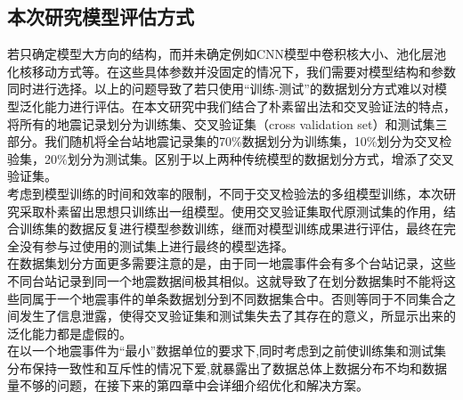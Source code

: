 \subsection{本次研究模型评估方式}
\indent 若只确定模型大方向的结构，而并未确定例如CNN模型中卷积核大小、池化层池化核移动方式等。在这些具体参数并没固定的情况下，我们需要对模型结构和参数同时进行选择。以上的问题导致了若只使用“训练-测试”的数据划分方式难以对模型泛化能力进行评估。在本文研究中我们结合了朴素留出法和交叉验证法的特点，将所有的地震记录划分为训练集、交叉验证集（cross validation set）和测试集三部分。我们随机将全台站地震记录集的70\%数据划分为训练集，10\%划分为交叉检验集，20\%划分为测试集。区别于以上两种传统模型的数据划分方式，增添了交叉验证集。\\
\indent 考虑到模型训练的时间和效率的限制，不同于交叉检验法的多组模型训练，本次研究采取朴素留出思想只训练出一组模型。使用交叉验证集取代原测试集的作用，结合训练集的数据反复进行模型参数训练，继而对模型训练成果进行评估，最终在完全没有参与过使用的测试集上进行最终的模型选择。\\
\indent 在数据集划分方面更多需要注意的是，由于同一地震事件会有多个台站记录，这些不同台站记录到同一个地震数据间极其相似。这就导致了在划分数据集时不能将这些同属于一个地震事件的单条数据划分到不同数据集合中。否则等同于不同集合之间发生了信息泄露，使得交叉验证集和测试集失去了其存在的意义，所显示出来的泛化能力都是虚假的。\\
\indent 在以一个地震事件为“最小”数据单位的要求下,同时考虑到之前使训练集和测试集分布保持一致性和互斥性的情况下爱,就暴露出了数据总体上数据分布不均和数据量不够的问题，在接下来的第四章中会详细介绍优化和解决方案。\\